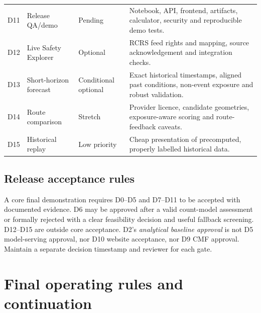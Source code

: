 \documentclass[11pt,a4paper,openany]{report}
\begin{document}
\begin{longtable}{@{}L{10mm}L{42mm}L{29mm}L{62mm}@{}}
D11 & Release QA/demo & Pending & Notebook, API, frontend, artifacts, calculator, security and reproducible demo tests.\\
D12 & Live Safety Explorer & Optional & RCRS feed rights and mapping, source acknowledgement and integration checks.\\
D13 & Short-horizon forecast & Conditional optional & Exact historical timestamps, aligned past conditions, non-event exposure and robust validation.\\
D14 & Route comparison & Stretch & Provider licence, candidate geometries, exposure-aware scoring and route-feedback caveats.\\
D15 & Historical replay & Low priority & Cheap presentation of precomputed, properly labelled historical data.\\
\bottomrule\end{longtable}
\normalsize

\section{Release acceptance rules}
A core final demonstration requires D0--D5 and D7--D11 to be accepted with documented evidence. D6 may be approved after a valid count-model assessment or formally rejected with a clear feasibility decision and useful fallback screening. D12--D15 are outside core acceptance. D2's \emph{analytical baseline approval} is not D5 model-serving approval, nor D10 website acceptance, nor D9 CMF approval. Maintain a separate decision timestamp and reviewer for each gate.

\chapter{Final operating rules and continuation}
\end{document}

